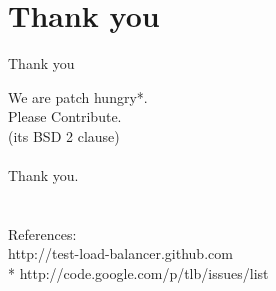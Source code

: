 \documentclass{beamer}
\begin{document}
\section*{Thank you}

\begin{frame}{Thank you}
  \begin{centering}
  {\huge We are patch hungry*.\\Please Contribute.\\}
  (its BSD 2 clause)\\
  \quad\\
  {\huge Thank you.}\\
  \quad\\
  \quad\\
  References:\\
  http://test-load-balancer.github.com
  \quad\\
  * http://code.google.com/p/tlb/issues/list\\
  \end{centering}
\end{frame}
\end{document}

